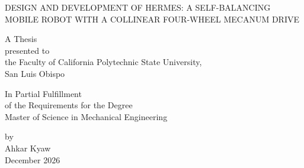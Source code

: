 \begin{titlepage}
\thispagestyle{empty}
\begin{center}
{\MakeUppercase{Design and Development of Hermes: A Self-Balancing Mobile Robot with a Collinear Four-Wheel Mecanum Drive}\par}

\vfill

A Thesis\\[0.5em]
presented to\\[0.5em]
the Faculty of California Polytechnic State University,\\[0.5em]
San Luis Obispo

\vfill

In Partial Fulfillment\\[0.5em]
of the Requirements for the Degree\\[0.5em]
Master of Science in Mechanical Engineering

\vfill

by\\[0.5em]
Ahkar Kyaw\\[0.5em]
December 2026
\end{center}
\end{titlepage}
